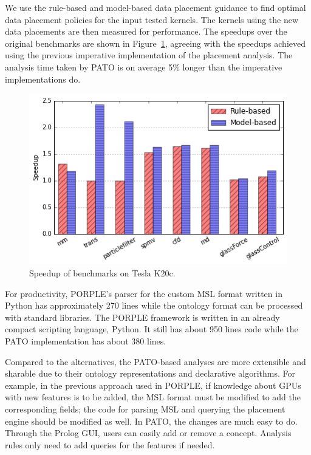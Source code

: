 We use the rule-based and model-based data placement guidance to find
optimal data placement policies for the input tested kernels.  The
kernels using the new data placements are then measured for
performance.  The speedups over the original benchmarks are shown in
Figure~\ref{fig:dp_speedup}, agreeing with the speedups achieved
using the previous imperative implementation of the placement
analysis. The analysis time taken by PATO is on average 5\% longer
than the imperative implementations do.

\begin{figure}[ht]
	\centering
	\includegraphics[width=0.6\columnwidth]{graph/dp_speedup}
	\caption{Speedup of benchmarks on Tesla K20c.}
	\label{fig:dp_speedup}
\end{figure}

For productivity, PORPLE's parser for the custom MSL format written in
Python has approximately 270 lines while the ontology format can be
processed with standard libraries. The PORPLE framework is written in
an already compact scripting language, Python.  It still has about 950
lines code while the PATO implementation has about 380 lines.

Compared to the alternatives, the PATO-based analyses are more
extensible and sharable due to their ontology representations and
declarative algorithms.  For example, in the previous approach used in
PORPLE, if knowledge about GPUs with new features is to be added, the
MSL format must be modified to add the corresponding fields; the code
for parsing MSL and querying the placement engine should be modified
as well.  In PATO, the changes are much easy to do. Through the Prolog
GUI, users can easily add or remove a concept. Analysis rules only
need to add queries for the features if needed.

